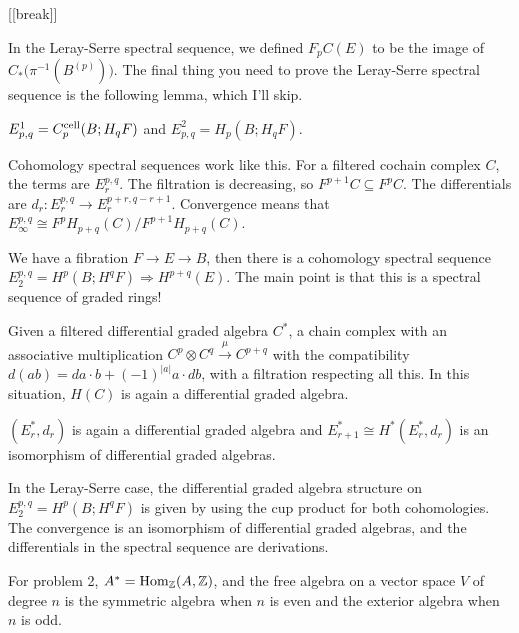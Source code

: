 [[break]]

In the Leray-Serre spectral sequence, we defined $F_p C(E)$ to be the image of $C_*\bigl(\pi^{-1}(B^{(p)})\bigr)$. The final thing you need to prove the Leray-Serre spectral sequence is the following lemma, which I'll skip.
\begin{lemma}
 $E^1_{p,q}=C^{\text{\rm cell}}_p(B;H_q F)$ and $E^2_{p,q}=H_p(B;H_qF)$.
\end{lemma}


Cohomology spectral sequences work like this. For a filtered cochain complex $C$, the terms are $E^{p,q}_r$. The filtration is decreasing, so $F^{p+1}C\subseteq F^p C$. The differentials are $d_r\colon E^{p,q}_r\to E^{p+r,q-r+1}_r$. Convergence means that $E^{p,q}_\infty\cong F^pH_{p+q}(C)/F^{p+1}H_{p+q}(C)$.
\begin{example}
 We have a fibration $F\to E\to B$, then there is a cohomology spectral sequence $E_2^{p,q}=H^p(B;H^qF)\Rightarrow H^{p+q}(E)$. The main point is that this is a spectral sequence of graded rings!
\end{example}
Given a filtered differential graded algebra $C^*$, a chain complex with an associative multiplication $C^p\otimes C^q\xrightarrow\mu C^{p+q}$ with the compatibility $d(ab)=da\cdot b + (-1)^{|a|}a\cdot db$, with a filtration respecting all this. In this situation, $H(C)$ is again a differential graded algebra.
\begin{theorem}
 $(E_r^*,d_r)$ is again a differential graded algebra and $E_{r+1}^*\cong H^*(E^*_r,d_r)$ is an isomorphism of differential graded algebras.
\end{theorem}
In the Leray-Serre case, the differential graded algebra structure on $E_2^{p,q}=H^p(B;H^qF)$ is given by using the cup product for both cohomologies. The convergence is an isomorphism of differential graded algebras, and the differentials in the spectral sequence are derivations.

For problem 2, $A^*=\operatorname{Hom}_{\mathbb{Z}}(A,\mathbb{Z})$, and the free algebra on a vector space $V$ of degree $n$ is the symmetric algebra when $n$ is even and the exterior algebra when $n$ is odd.






